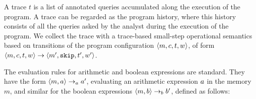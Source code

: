 \documentclass[a4paper,11pt]{article}
\begin{document}
A trace $t$ is a list of annotated queries accumulated along the execution of the program. 
A trace can be regarded as the program history, where this history consists of all the queries asked by the analyst during the execution of the program. 
We collect the trace with a trace-based small-step operational semantics based on transitions of the program configuration $\langle m, c, t,w \rangle$,
of form $ \langle m,c, t, w \rangle \to \langle m', \mathtt{skip}, t', w' \rangle $. 


%
%
The evaluation rules for arithmetic and boolean expressions are standard. 
They have the form $\langle m,a \rangle \rightarrow_a a' $, evaluating an arithmetic expression $a$ in the memory $m$, and similar for the boolean expressions $\langle m, b \rangle \rightarrow_b b'$, defined as follows:
%
%
\end{document}
